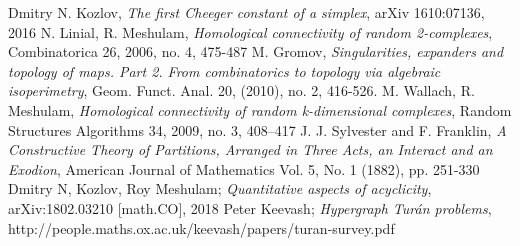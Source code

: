 \documentclass[11pt,english,singlespacing,headsepline]{MastersDoctoralThesis}
\begin{document}
\begin{thebibliography}{1}
Dmitry N. Kozlov, \textit{The first Cheeger constant of a simplex}, arXiv 1610:07136, 2016
N. Linial, R. Meshulam, \textit{Homological connectivity of random 2-complexes}, Combinatorica 26, 2006,
no. 4, 475-487
M. Gromov, \textit{Singularities, expanders and topology of maps. Part 2. From combinatorics to topology
via algebraic isoperimetry}, Geom. Funct. Anal. 20, (2010), no. 2, 416-526.
M. Wallach, R. Meshulam, \textit{Homological connectivity of random k-dimensional complexes}, Random Structures Algorithms 34, 2009, no. 3, 408–417
J. J. Sylvester and F. Franklin, \textit{A Constructive Theory of Partitions, Arranged in Three Acts, an Interact and an Exodion}, American Journal of Mathematics
Vol. 5, No. 1 (1882), pp. 251-330
 Dmitry N, Kozlov, Roy Meshulam; \textit{Quantitative aspects of acyclicity}, 	arXiv:1802.03210 [math.CO], 2018
 Peter Keevash; \textit{Hypergraph Tur\'{a}n problems},\\http://people.maths.ox.ac.uk/keevash/papers/turan-survey.pdf
\end{thebibliography}
\end{document}
